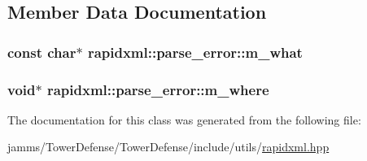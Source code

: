 \subsection{Member Data Documentation}
\hypertarget{classrapidxml_1_1parse__error_a41bffadc72eec238cf4b7d14c10c16ca}{
\subsubsection[{m\+\_\+what}]{\setlength{\rightskip}{0pt plus 5cm}const char$\ast$ rapidxml\+::parse\+\_\+error\+::m\+\_\+what\hspace{0.3cm}{\ttfamily [private]}}}\label{classrapidxml_1_1parse__error_a41bffadc72eec238cf4b7d14c10c16ca}
\hypertarget{classrapidxml_1_1parse__error_aa5a164653ac347adddf47b264620d80f}{
\subsubsection[{m\+\_\+where}]{\setlength{\rightskip}{0pt plus 5cm}void$\ast$ rapidxml\+::parse\+\_\+error\+::m\+\_\+where\hspace{0.3cm}{\ttfamily [private]}}}\label{classrapidxml_1_1parse__error_aa5a164653ac347adddf47b264620d80f}


The documentation for this class was generated from the following file\+:\begin{DoxyCompactItemize}
\item 
jamms/\+Tower\+Defense/\+Tower\+Defense/include/utils/\hyperlink{rapidxml_8hpp}{rapidxml.\+hpp}\end{DoxyCompactItemize}
